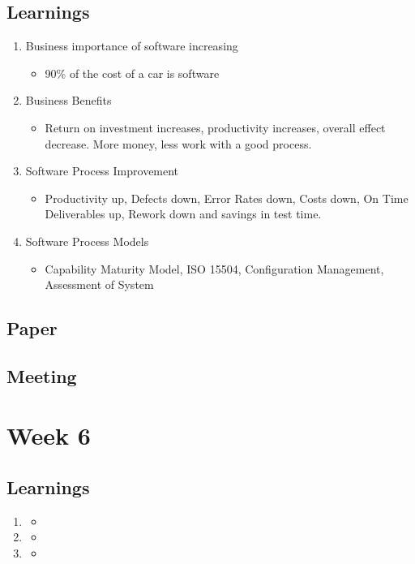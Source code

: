 \section{Learnings}
\begin{enumerate}
\item Business importance of software increasing
\begin{itemize}
\item 90\% of the cost of a car is software
\end{itemize}
\item Business Benefits
\begin{itemize}
\item Return on investment increases, productivity increases, overall effect decrease. More money, less work with a good process.
\end{itemize}
\item Software Process Improvement
\begin{itemize}
\item Productivity up, Defects down, Error Rates down, Costs down, On Time Deliverables up, Rework down and savings in test time. 
\end{itemize}
\item Software Process Models
\begin{itemize}
\item Capability Maturity Model, ISO 15504, Configuration Management, Assessment of System
\end{itemize}
\end{enumerate}

\section{Paper}

\section{Meeting}
\chapter{Week 6}

\section{Learnings}
\begin{enumerate}
\item
\begin{itemize}
\item
\end{itemize}
\item
\begin{itemize}
\item
\end{itemize}
\item
\begin{itemize}
\item
\end{itemize}
\end{enumerate}

